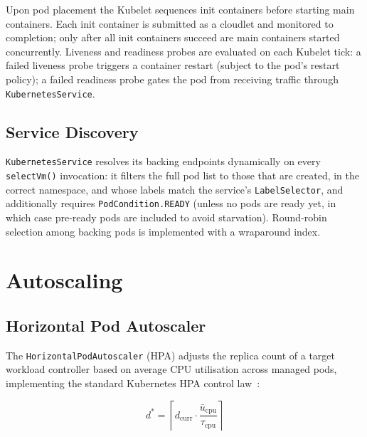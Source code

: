 \documentclass[ASNA,twocolumn]{USG}
\begin{document}
    Upon pod placement the Kubelet sequences init containers before
    starting main containers. Each init container is submitted as a
    cloudlet and monitored to completion; only after all init containers
    succeed are main containers started concurrently. Liveness and
    readiness probes are evaluated on each Kubelet tick: a failed
    liveness probe triggers a container restart (subject to the pod's
    restart policy); a failed readiness probe gates the pod from
    receiving traffic through \texttt{KubernetesService}.

    \subsection{Service Discovery}

    \texttt{KubernetesService} resolves its backing endpoints
    dynamically on every \texttt{selectVm()} invocation: it filters the
    full pod list to those that are created, in the correct namespace, and
    whose labels match the service's \texttt{LabelSelector}, and
    additionally requires \texttt{PodCondition.READY} (unless no pods are
    ready yet, in which case pre-ready pods are included to avoid
    starvation). Round-robin selection among backing pods is implemented
    with a wraparound index.

    \section{Autoscaling}\label{sec:autoscaling}

    \subsection{Horizontal Pod Autoscaler}

    The \texttt{HorizontalPodAutoscaler} (HPA) adjusts the replica count
    of a target workload controller based on average CPU utilisation
    across managed pods, implementing the standard Kubernetes HPA control law~\cite{KubernetesDocs}:

    \begin{equation}\label{eq:hpa}
        d^* = \left\lceil d_{\mathrm{curr}} \cdot
                  \frac{\bar{u}_{\mathrm{cpu}}}{\tau_{\mathrm{cpu}}} \right\rceil
    \end{equation}
\end{document}

